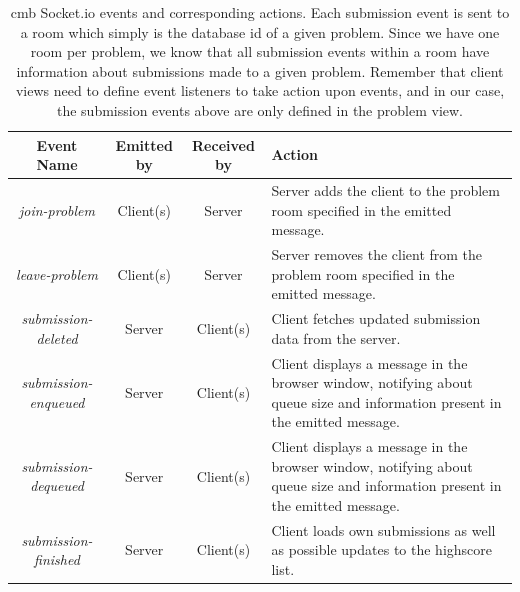 \begin{table}[t!]
    \centering
    \begin{tabular}{ | c | c | c | p{3.5cm} | }
    \hline
    \textbf{Event Name} & \textbf{Emitted by} & \textbf{Received by} & \textbf{Action}\\
    \hline
    \textit{join-problem} & Client(s) & Server & Server adds the client to the problem room specified in the emitted message. \\ \hline
    \textit{leave-problem} & Client(s) & Server & Server removes the client from the problem room specified in the emitted message. \\ \hline
    \textit{submission-deleted} & Server & Client(s) & Client fetches updated submission data from the server. \\ \hline
    \textit{submission-enqueued} & Server & Client(s) & Client displays a message in the browser window, notifying about queue size and information present in the emitted message. \\ \hline
    \textit{submission-dequeued} & Server & Client(s) & Client displays a message in the browser window, notifying about queue size and information present in the emitted message. \\ \hline
    \textit{submission-finished} & Server & Client(s) & Client loads own submissions as well as possible updates to the highscore list. \\ \hline
    \end{tabular}
    \caption[\gls{cmb} Socket.io events and corresponding actions]{\gls{cmb} Socket.io events and corresponding actions. Each submission event is sent to a room which simply is the database id of a given problem. Since we have one room per problem, we know that all submission events within a room have information about submissions made to a given problem. Remember that client views need to define event listeners to take action upon events, and in our case, the submission events above are only defined in the problem view.}
    \label{tab:cmb-socketio-events}
\end{table}

